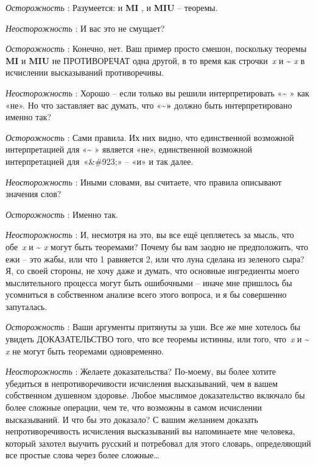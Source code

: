 \documentclass[../main.tex]{subfiles}
\begin{document}
\emph{Осторожность} : Разумеется: и \textbf{MI} , и \textbf{MIU} \--- теоремы.

\emph{Неосторожность} : И вас это не смущает?

\emph{Осторожность} : Конечно, нет. Ваш пример просто смешон, поскольку теоремы \textbf{MI} и \textbf{MIU} не ПРОТИВОРЕЧАТ одна другой, в то время как строчки~\emph{x} и \textbf{\textasciitilde{}} \emph{x} в исчислении высказываний противоречивы.

\emph{Неосторожность} : Хорошо \--- если только вы решили интерпретировать «\textbf{\textasciitilde{}} » как «не». Но что заставляет вас думать, что «\textbf{\textasciitilde»} должно быть интерпретировано именно так?

\emph{Осторожность} : Сами правила. Их них видно, что единственной возможной интерпретацией для «\textbf{\textasciitilde{}} » является «не», единственной возможной интерпретацией для~«\&\#923;» \--- «и» и так далее.

\emph{Неосторожность} : Иными словами, вы считаете, что правила описывают значения слов?

\emph{Осторожность} : Именно так.

\emph{Неосторожность} : И, несмотря на это, вы все ещё цепляетесь за мысль, что обе~\emph{x} и \textbf{\textasciitilde{}} \emph{x} могут быть теоремами? Почему бы вам заодно не предположить, что ежи \--- это жабы, или что 1 равняется 2, или что луна сделана из зеленого сыра? Я, со своей стороны, не хочу даже и думать, что основные ингредиенты моего мыслительного процесса могут быть ошибочными \--- иначе мне пришлось бы усомниться в собственном анализе всего этого вопроса, и я бы совершенно запуталась.

\emph{Осторожность} : Ваши аргументы притянуты за уши. Все же мне хотелось бы увидеть ДОКАЗАТЕЛЬСТВО того, что все теоремы истинны, или того, что~\emph{x} и \textbf{\textasciitilde{}} \emph{x} не могут быть теоремами одновременно.

\emph{Неосторожность} : Желаете доказательства? По-моему, вы более хотите убедиться в непротиворечивости исчисления высказываний, чем в вашем собственном душевном здоровье. Любое мыслимое доказательство включало бы более сложные операции, чем те, что возможны в самом исчислении высказываний. И что бы это доказало? С вашим желанием доказать непротиворечивость исчисления высказываний вы напоминаете мне человека, который захотел выучить русский и потребовал для этого словарь, определяющий все простые слова через более сложные\ldots{}
\end{document}
